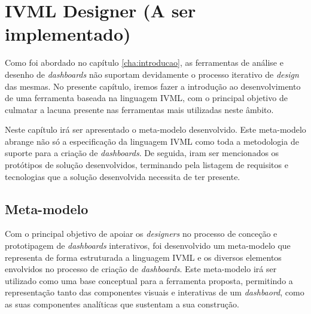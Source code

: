
%

\chapter{IVML Designer (A ser implementado)}
\label{cha:ivml_designer}

Como foi abordado no capítulo \ref{cha:introducao}, as ferramentas de análise e desenho de \textit{dashboards} não suportam devidamente o processo iterativo de \textit{design} das mesmas. No presente capítulo, iremos fazer a introdução ao desenvolvimento de uma ferramenta baseada na linguagem \gls{IVML}, com o principal objetivo de culmatar a lacuna presente nas ferramentas mais utilizadas neste âmbito.

Neste capítulo irá ser apresentado o meta-modelo desenvolvido. Este meta-modelo abrange não só a especificação da linguagem \gls{IVML} como toda a metodologia de suporte para a criação de \textit{dashboards}. De seguida, iram ser mencionados os protótipos de solução desenvolvidos, terminando pela listagem de requisitos e tecnologias que a solução desenvolvida necessita de ter presente.

\section{Meta-modelo} %
\label{sec:meta_modelo}

Com o principal objetivo de apoiar os \textit{designers} no processo de conceção e prototipagem de \textit{dashboards} interativos, foi desenvolvido um meta-modelo que representa de forma estruturada a linguagem IVML e os diversos elementos envolvidos no processo de criação de \textit{dashboards}. Este meta-modelo irá ser utilizado como uma base conceptual para a ferramenta proposta, permitindo a representação tanto das componentes visuais e interativas de um \textit{dashbaord}, como as suas componentes analíticas que sustentam a sua construção.

